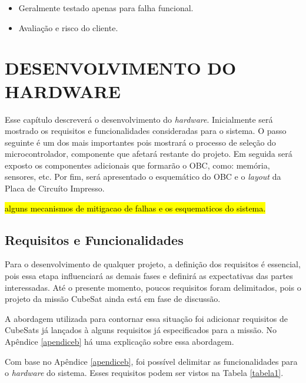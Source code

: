 \begin{itemize}
\begin{itemize}
	\item Geralmente testado apenas para falha funcional.
    \item Avaliação e risco do cliente.

	\end{itemize}
\end{itemize}


\chapter[DESENVOLVIMENTO DO HARDWARE]{DESENVOLVIMENTO DO HARDWARE}
\label{secaoHardware}
Esse capítulo descreverá o desenvolvimento do \textit{hardware}. Inicialmente será mostrado os requisitos e funcionalidades consideradas para o sistema. O passo seguinte é um dos mais importantes pois mostrará o processo de seleção do microcontrolador, componente que afetará restante do projeto. Em seguida será exposto os componentes adicionais que formarão o OBC, como: memória, sensores, etc. Por fim, será apresentado o esquemático do OBC e o \textit{layout} da Placa de Circuíto Impresso. 

\hl{alguns mecanismos de mitigacao de falhas e os esquematicos do sistema.}

\section{Requisitos e Funcionalidades}
\label{seção1_1}
Para o desenvolvimento de qualquer projeto, a definição dos requisitos é essencial, pois essa etapa influenciará as demais fases e definirá as expectativas das partes interessadas. Até o presente momento, poucos requisitos foram delimitados, pois o projeto da missão CubeSat ainda está em fase de discussão. 

A abordagem utilizada para contornar essa situação foi adicionar requisitos de CubeSats já lançados à alguns requisitos já especificados para a missão. No Apêndice \ref{apendiceb} há uma explicação sobre essa abordagem. 

Com base no Apêndice \ref{apendiceb}, foi possível delimitar as funcionalidades para o \textit{hardware} do sistema. Esses requisitos podem ser vistos na Tabela \ref{tabela1}.

